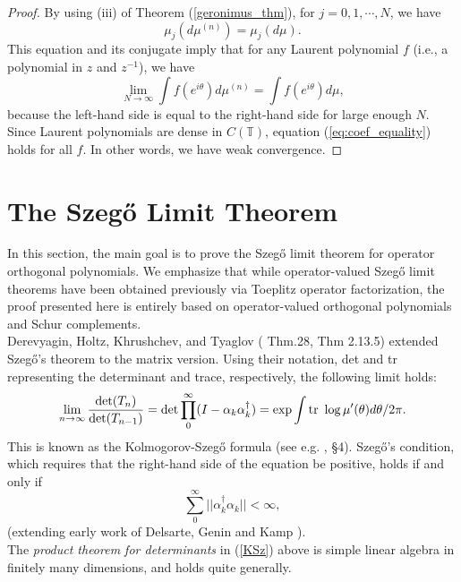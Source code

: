 \documentclass[11pt]{article}
\begin{document}
\begin{proof}
By using (iii) of Theorem (\ref{geronimus_thm}), for $j=0,1,\cdots,N$, we have $$\mu_{j}(d\mu^{(n)})=\mu_{j}(d\mu).$$
This equation and its conjugate imply that for any Laurent polynomial $f$ (i.e., a polynomial in $z$ and $z^{-1}$), we have
\begin{equation} \label{eq:coef_equality}
  \lim_{N \rightarrow \infty} \int f(e^{i\theta})d\mu^{(n)} = \int f(e^{i\theta})d\mu,
\end{equation}
because the left-hand side is equal to the right-hand side for large enough $N$. Since Laurent polynomials are dense in $C(\mathbb{T})$, equation (\ref{eq:coef_equality}) holds for all $f$. In other words, we have weak convergence.
\end{proof}


\section{The Szeg\H{o} Limit Theorem}

In this section, the main goal is to prove the Szeg\H{o} limit theorem for operator orthogonal polynomials. We emphasize that while operator-valued Szegő limit theorems have been obtained previously via Toeplitz operator factorization, the proof presented here is entirely based on operator-valued orthogonal polynomials and Schur complements.\\

Derevyagin, Holtz, Khrushchev, and Tyaglov (\cite{DerHK} Thm.28, \cite{Sim2} Thm 2.13.5) extended Szeg\H{o}'s theorem to the matrix version. Using their notation, det and tr representing the determinant and trace, respectively, the following limit holds:
\begin{equation} \label{KSz}
\lim_{n \rightarrow{ \infty}}\frac{\mathrm{det}(T_{n})}{\mathrm{det}(T_{n-1})}=\det \prod_0^{\infty} (I - {\alpha}_k {\alpha}_k^{\dag})
= \exp \int \hbox{tr} \ \log \mu'(\theta) d \theta /2 \pi .
\end{equation}
This is known as the Kolmogorov-Szeg\H{o} formula (see e.g. \cite{Bin1}, \S 4). Szeg\H{o}'s condition, which requires that the right-hand side of the equation be positive, holds if and only if
$$
\sum_0^{\infty} || {\alpha}_k^{\dag} {\alpha}_k || < \infty, 
$$
(extending early work of Delsarte, Genin and Kamp \cite{DelGK}).  \\
\noindent The {\it product theorem for determinants} in (\ref{KSz}) above is simple linear algebra in finitely many dimensions, and holds quite generally.\\
\end{document}
